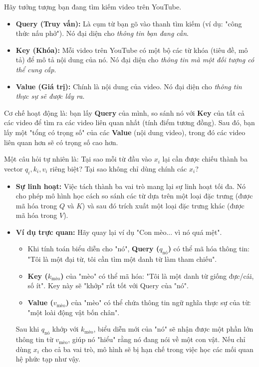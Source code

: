 \begin{tcolorbox}[
    title={Trực giác về Query, Key, Value},
    colback=yellow!10!white, colframe=yellow!50!black, fonttitle=\bfseries
]
Hãy tưởng tượng bạn đang tìm kiếm video trên YouTube.
\begin{itemize}
    \item \textbf{Query (Truy vấn):} Là cụm từ bạn gõ vào thanh tìm kiếm (ví dụ: "công thức nấu phở"). Nó đại diện cho \textit{thông tin bạn đang cần}.
    \item \textbf{Key (Khóa):} Mỗi video trên YouTube có một bộ các từ khóa (tiêu đề, mô tả) để mô tả nội dung của nó. Nó đại diện cho \textit{thông tin mà một đối tượng có thể cung cấp}.
    \item \textbf{Value (Giá trị):} Chính là nội dung của video. Nó đại diện cho \textit{thông tin thực sự sẽ được lấy ra}.
\end{itemize}
Cơ chế hoạt động là: bạn lấy \textbf{Query} của mình, so sánh nó với \textbf{Key} của tất cả các video để tìm ra các video liên quan nhất (tính điểm tương đồng). Sau đó, bạn lấy một "tổng có trọng số" của các \textbf{Value} (nội dung video), trong đó các video liên quan hơn sẽ có trọng số cao hơn.
\end{tcolorbox}

\begin{tcolorbox}[
    title={Tại sao lại cần đến ba vai trò Q, K, V?},
    colback=green!5!white, colframe=green!50!black, fonttitle=\bfseries
]
Một câu hỏi tự nhiên là: Tại sao mỗi từ đầu vào $x_i$ lại cần được chiếu thành ba vector $q_i, k_i, v_i$ riêng biệt? Tại sao không chỉ dùng chính các $x_i$?
\begin{itemize}
    \item \textbf{Sự linh hoạt:} Việc tách thành ba vai trò mang lại sự linh hoạt tối đa. Nó cho phép mô hình học cách so sánh các từ dựa trên một loại đặc trưng (được mã hóa trong $Q$ và $K$) và sau đó trích xuất một loại đặc trưng khác (được mã hóa trong $V$).
    \item \textbf{Ví dụ trực quan:} Hãy quay lại ví dụ "Con mèo... vì nó quá mệt".
        \begin{itemize}
            \item Khi tính toán biểu diễn cho "nó", \textbf{Query ($q_{\text{nó}}$)} có thể mã hóa thông tin: "Tôi là một đại từ, tôi cần tìm một danh từ làm tham chiếu".
            \item \textbf{Key ($k_{\text{mèo}}$)} của "mèo" có thể mã hóa: "Tôi là một danh từ giống đực/cái, số ít". Key này sẽ "khớp" rất tốt với Query của "nó".
            \item \textbf{Value ($v_{\text{mèo}}$)} của "mèo" có thể chứa thông tin ngữ nghĩa thực sự của từ: "một loài động vật bốn chân".
        \end{itemize}
        Sau khi $q_{\text{nó}}$ khớp với $k_{\text{mèo}}$, biểu diễn mới của "nó" sẽ nhận được một phần lớn thông tin từ $v_{\text{mèo}}$, giúp nó "hiểu" rằng nó đang nói về một con vật. Nếu chỉ dùng $x_i$ cho cả ba vai trò, mô hình sẽ bị hạn chế trong việc học các mối quan hệ phức tạp như vậy.
\end{itemize}
\end{tcolorbox}

